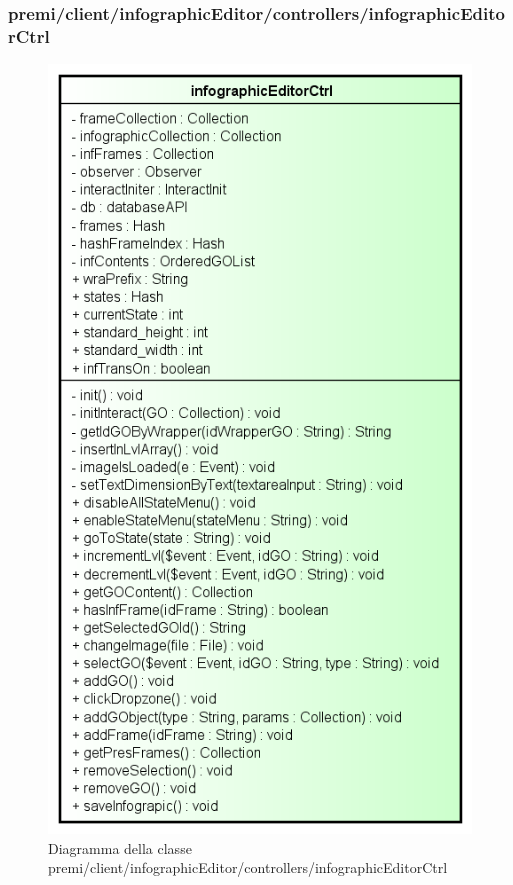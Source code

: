 \subsubsection{premi/client/infographicEditor/controllers/infographicEditorCtrl}
\begin{figure}[h]
\begin{center}
\includegraphics[scale=0.55]{img/diacla/infographicEditorCtrl.png}
\caption{Diagramma della classe premi/client/infographicEditor/controllers/infographicEditorCtrl}
\end{center}
\end{figure}



